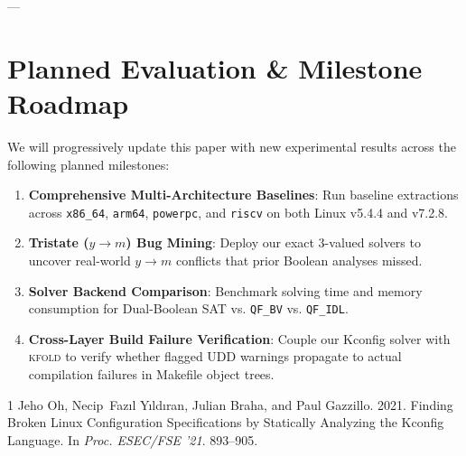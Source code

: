 \documentclass[acmsmall,screen,review,nonacm]{acmart}
\begin{document}
---

\section{Planned Evaluation \& Milestone Roadmap}
\label{sec:roadmap}

We will progressively update this paper with new experimental results across the following planned milestones:
\begin{enumerate}
    \item \textbf{Comprehensive Multi-Architecture Baselines}: Run baseline extractions across \texttt{x86\_64}, \texttt{arm64}, \texttt{powerpc}, and \texttt{riscv} on both Linux v5.4.4 and v7.2.8.
    \item \textbf{Tristate ($y \to m$) Bug Mining}: Deploy our exact 3-valued solvers to uncover real-world $y \to m$ conflicts that prior Boolean analyses missed.
    \item \textbf{Solver Backend Comparison}: Benchmark solving time and memory consumption for Dual-Boolean SAT vs. \texttt{QF\_BV} vs. \texttt{QF\_IDL}.
    \item \textbf{Cross-Layer Build Failure Verification}: Couple our Kconfig solver with \textsc{kfold} to verify whether flagged UDD warnings propagate to actual compilation failures in Makefile object trees.
\end{enumerate}


\begin{thebibliography}{1}
Jeho Oh, Necip~Faz{\i}l Y{\i}ld{\i}ran, Julian Braha, and Paul Gazzillo. 2021.
\newblock Finding Broken Linux Configuration Specifications by Statically Analyzing the Kconfig Language.
\newblock In \emph{Proc. ESEC/FSE '21}. 893--905.
\end{thebibliography}
\end{document}
